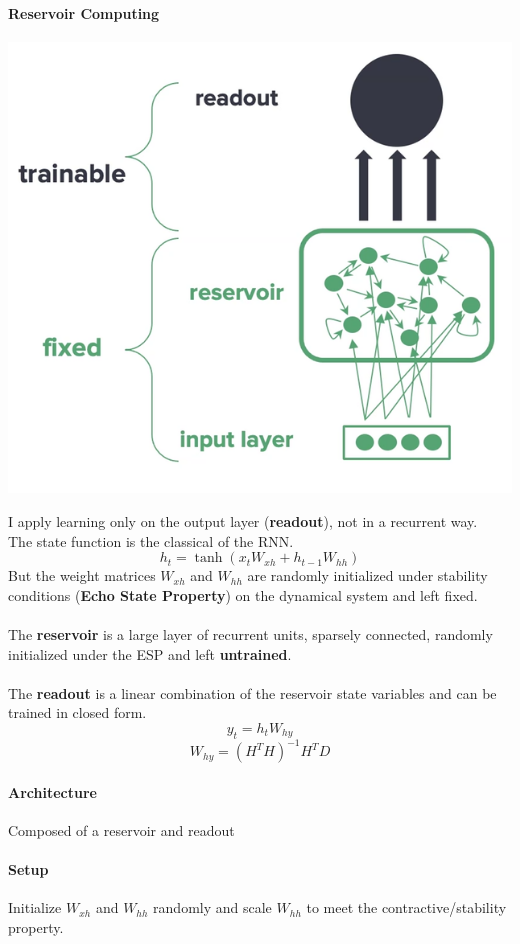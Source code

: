 \documentclass[10pt]{report}
\begin{document}
\paragraph{Reservoir Computing}
\begin{center}
	\includegraphics[scale=0.5]{103.png}
\end{center}
I apply learning only on the output layer (\textbf{readout}), not in a recurrent way.\\
The state function is the classical of the RNN.
$$h_t = \tanh(x_tW_{xh}+h_{t-1}W_{hh})$$
But the weight matrices $W_{xh}$ and $W_{hh}$ are randomly initialized under stability conditions (\textbf{Echo State Property}) on the dynamical system and left fixed.\\\\
The \textbf{reservoir} is a large layer of recurrent units, sparsely connected, randomly initialized under the ESP and left \textbf{untrained}.\\\\
The \textbf{readout} is a linear combination of the reservoir state variables and can be trained in closed form.
$$y_t = h_tW_{hy}$$
$$W_{hy} = (H^TH)^{-1}H^TD$$
\paragraph{Architecture} Composed of a reservoir and readout
\paragraph{Setup} Initialize $W_{xh}$ and $W_{hh}$ randomly and scale $W_{hh}$ to meet the contractive/stability property.
\end{document}

